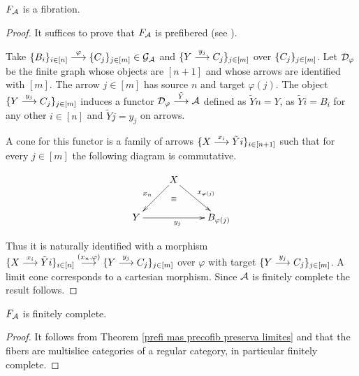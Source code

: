 \begin{proposition}\label{obtuvimos una fibracion}
$F_{\mathcal{A}}$ is a fibration.
\end{proposition}

\begin{proof}


It suffices to prove that $F_{\mathcal{A}}$ is prefibered (see \cite[page 143]{sga1}).




Take ${\{B_i\}_{ i \in [n]} \overset {\varphi} {\longrightarrow} \{C_j\}_{ j \in [m]} \in \mathcal{G}_{\mathcal{A}^{}}}$ and  $\{Y \overset {y_j} {\longrightarrow} C_j\}_{j \in [m]}$ over $\{C_j\}_{ j \in [m]}$. Let $\mathcal{D}_{\varphi}$ be the finite graph whose objects are $[n+1]$ and whose arrows are identified with $[m]$. The arrow $j \in [m]$ has source $n$ and target $\varphi(j)$. The object $\{Y \overset {y_j} {\longrightarrow} C_j\}_{j \in [m]}$ induces a functor ${\mathcal{D}_{\varphi} \overset {\tilde{Y}} {\longrightarrow} \mathcal{A}}$ defined as $\tilde{Y}n=Y$, as $\tilde{Y}i=B_i$ for any other $i \in [n]$  and $\tilde{Y}j=y_j$ on arrows.

 A cone  for this functor is a family of arrows ${\{X \overset {x_i} {\longrightarrow} \tilde{Y}i\}_{i \in [n+1]}}$ such that for every ${j\in[m]}$ the following diagram is commutative.
 
\[
\xymatrix{& X \ar[dl]_{x_n} \ar[dr]^{x_{\varphi(j)}} \ar@{}[d]|\equiv \\
		  Y \ar[rr]_{y_j} && B_{\varphi(j)}}
\] 
 
\noindent Thus it is naturally identified with a morphism ${\{X \overset {x_i} {\longrightarrow} \tilde{Y}i\}_{i \in [n]} \overset {(x_n,\varphi)} {\longrightarrow} \{Y \overset {y_j} {\longrightarrow} C_j\}_{j \in [m]}}$ over $\varphi$ with target $\{Y \overset {y_j} {\longrightarrow} C_j\}_{j \in [m]}$. A limit cone corresponds to a cartesian morphism. Since $\mathcal{A}$ is finitely complete the result follows.
\end{proof}

\begin{proposition}
 $F_{\mathcal{A}}$ is finitely complete.
\end{proposition}

\begin{proof}
It follows from Theorem \ref{prefi mas precofib preserva limites} and that the fibers are multislice categories of a regular category, in particular finitely complete.
\end{proof}

